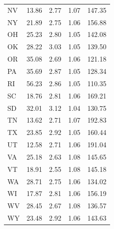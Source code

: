 \documentclass[Afour,sageh,times]{sagej}
\begin{document}
\begin{table}
\begin{tabular}{ l r r r r }
	NV    & 13.86                       & 2.77                 & 1.07         & 147.35                    \\
	NY    & 21.89                       & 2.75                 & 1.06         & 156.88                    \\
	OH    & 25.23                       & 2.80                 & 1.05         & 142.08                    \\
	OK    & 28.22                       & 3.03                 & 1.05         & 139.50                    \\
	OR    & 35.08                       & 2.69                 & 1.06         & 121.18                    \\
	PA    & 35.69                       & 2.87                 & 1.05         & 128.34                    \\
	RI    & 56.23                       & 2.86                 & 1.05         & 110.35                    \\
	SC    & 18.76                       & 2.81                 & 1.06         & 169.21                    \\
	SD    & 32.01                       & 3.12                 & 1.04         & 130.75                    \\
	TN    & 13.62                       & 2.71                 & 1.07         & 192.83                    \\
	TX    & 23.85                       & 2.92                 & 1.05         & 160.44                    \\
	UT    & 12.58                       & 2.71                 & 1.06         & 191.04                    \\
	VA    & 25.18                       & 2.63                 & 1.08         & 145.65                    \\
	VT    & 18.91                       & 2.55                 & 1.08         & 145.18                    \\
	WA    & 28.71                       & 2.75                 & 1.06         & 134.02                    \\
	WI    & 17.87                       & 2.81                 & 1.06         & 156.19                    \\
	WV    & 28.45                       & 2.67                 & 1.08         & 136.57                    \\
	WY    & 23.48                       & 2.92                 & 1.06         & 143.63                    \\
	\bottomrule
\end{tabular}
\end{table}
\restoregeometry
\end{document}
